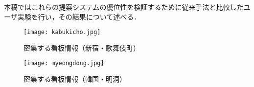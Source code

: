   本稿ではこれらの提案システムの優位性を検証するために従来手法と比較したユーザ実験を行い，その結果について述べる．

  \begin{figure}[tb]
    \centerline{\texttt{[image: kabukicho.jpg]}}
    \caption{密集する看板情報（新宿・歌舞伎町）}
    \label{figure:kabukicho}
    \vspace{1cm}
    \centerline{\texttt{[image: myeongdong.jpg]}}
    \caption{密集する看板情報（韓国・明洞）}
    \label{figure:myeongdong}
  \end{figure}
